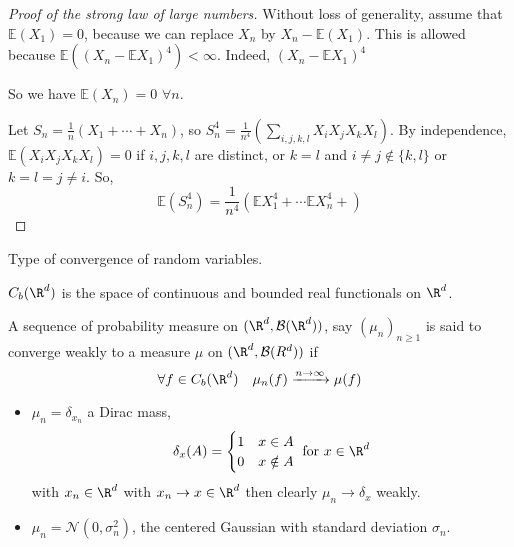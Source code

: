 \documentclass{article}
\newcommand{\1}[1]{\mathbbm{1}_{#1}}
\begin{document}
\begin{proof}[Proof of the strong law of large numbers]
    Without loss of generality, assume that $\mathbb{E}(X_1) = 0$, because we can replace $X_n$ by $X_n - \mathbb{E}(X_1)$.
    This is allowed because $\mathbb{E}((X_n - \mathbb{E}X_1)^4) < \infty$.
    Indeed, $(X_n - \mathbb{E}X_1)^4 $

    So we have $\mathbb{E}(X_n) = 0$ $\forall n$.

    Let $S_n = \frac{1}{n} (X_1 + \dotsb + X_n)$, so $S_n^4  = \frac{1}{n^4} (\sum_{i,j,k,l} X_i X_j X_k X_l)$.
    By independence, $\mathbb{E}(X_i X_j X_k X_l) = 0$ if $i, j, k, l$ are distinct, or $k = l$ and $i \neq j \notin \{k, l\}$ or $k = l = j \neq i$.
    So,
    \begin{equation*}
        \mathbb{E}(S_n^4) = \frac{1}{n^4} (\mathbb{E}X_1^4 + \dotsb \mathbb{E}X_n^4 + )
    \end{equation*}
\end{proof}

Type of convergence of random variables.
\begin{notation}
    $C_b(\R^d)$ is the space of continuous and bounded real functionals on $\R^d$.
\end{notation}

\begin{defi}
    A sequence of probability measure on $(\R^d, \mathcal{B}(\R^d))$, say $(\mu_n)_{n \geq 1}$ is said to converge weakly to a measure $\mu$ on $(\R^d, \mathcal{B}(R^d))$ if
    \begin{equation*}
        \forall f \in C_b(\R^d) \quad \mu_n(f) \xrightarrow{n \to \infty} \mu(f)
    \end{equation*}
\end{defi}
\begin{eg}
    \leavevmode
    \begin{itemize}
        \item $\mu_n = \delta_{x_n}$ a Dirac mass,
            \begin{equation*}
                \delta_x(A) =
                \begin{cases}
                    1 & x \in A \\
                    0 & x \notin A
                \end{cases}
                \text{ for } x \in \R^d
            \end{equation*}
            with $x_n \in \R^d$ with $x_n \to x \in \R^d$ then clearly $\mu_n \to \delta_x$ weakly.
        \item $\mu_n = \mathcal{N}(0, \sigma_n^2)$, the centered Gaussian with standard deviation $\sigma_n$.
    \end{itemize}
\end{eg}
\end{document}
